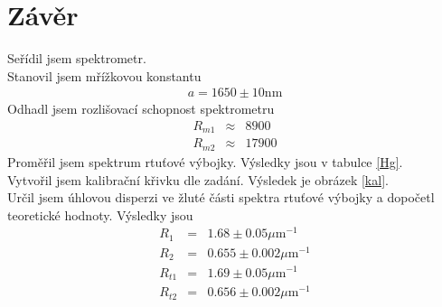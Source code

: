 \documentclass[a4paper,12pt]{article}
\begin{document}
\section{Závěr}
Seřídil jsem spektrometr. \\
Stanovil jsem mřížkovou konstantu
\begin{eqnarray}
a=1650\pm10 \mbox{nm}
\end{eqnarray}
Odhadl jsem rozlišovací schopnost spektrometru
\begin{eqnarray}
R_{m1}&\approx&8900 \\
R_{m2}&\approx&17900
\end{eqnarray}
Proměřil jsem spektrum rtuťové výbojky. Výsledky jsou v tabulce \ref{Hg}. \\
Vytvořil jsem kalibrační křivku dle zadání. Výsledek je obrázek \ref{kal}. \\
Určil jsem úhlovou disperzi ve žluté části spektra rtuťové výbojky a dopočetl teoretické hodnoty. Výsledky jsou
\begin{eqnarray}
R_1&=&1.68\pm0.05 \mu\mbox{m}^{-1} \\
R_2&=&0.655\pm0.002 \mu\mbox{m}^{-1}\\
R_{t1}&=&1.69\pm0.05 \mu\mbox{m}^{-1} \\
R_{t2}&=&0.656\pm0.002 \mu\mbox{m}^{-1}
\end{eqnarray}
\end{document}
